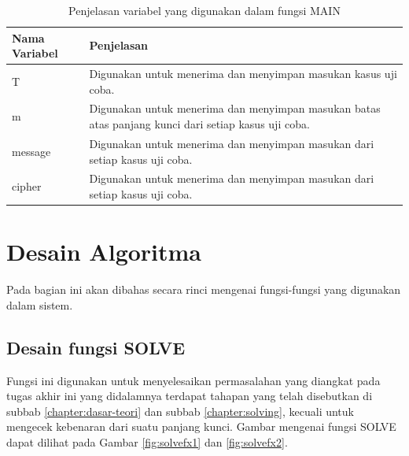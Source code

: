 \begin{table}[H]
	 	\caption{Penjelasan variabel yang digunakan dalam fungsi MAIN}
		\begin{tabular}   {|p{3cm}|p{6cm}|}\hline
		Nama Variabel&Penjelasan \\ \hline
		T&Digunakan untuk menerima dan menyimpan masukan kasus uji coba. \\ \hline
		m&Digunakan untuk menerima dan menyimpan masukan batas atas panjang kunci dari setiap kasus uji coba. \\ \hline
		message&Digunakan untuk menerima dan menyimpan masukan \plaintext dari setiap kasus uji coba.\\ \hline
		cipher&Digunakan untuk menerima dan menyimpan masukan \ciphertext dari setiap kasus uji coba. \\ \hline
		\end{tabular}%
		\label{tab:mainvar}
	\end{table}
	
\section{Desain Algoritma}
 Pada bagian ini akan dibahas secara rinci mengenai fungsi-fungsi yang digunakan dalam sistem.  
  \subsection{Desain fungsi SOLVE}
  \label{chapter:fxsolve}
  Fungsi ini digunakan untuk menyelesaikan permasalahan yang diangkat pada tugas akhir ini yang didalamnya terdapat tahapan yang telah disebutkan di subbab \ref{chapter:dasar-teori} dan subbab \ref{chapter:solving}, kecuali untuk mengecek kebenaran dari suatu panjang kunci. Gambar mengenai fungsi SOLVE dapat dilihat pada Gambar \ref{fig:solvefx1} dan \ref{fig:solvefx2}. %
  
